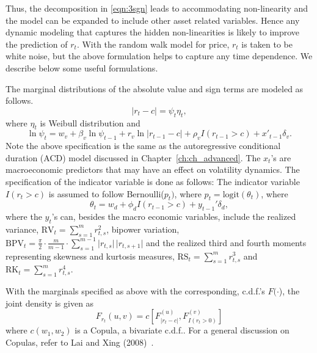 Thus, the decomposition in \eqref{eqn:3sgn} leads to accommodating non-linearity and the model can be expanded to include other asset related variables. Hence any dynamic modeling that captures the hidden non-linearities is likely to improve the prediction of $r_{t}$. With the random walk model for price, $r_t$ is taken to be white noise, but the above formulation helps to capture any time dependence. We describe below some useful formulations.


The marginal distributions of the absolute value and sign terms are modeled as follows.
	\begin{equation} \label{eqn:psieta}
	\lvert r_{t} - c \rvert = \psi_{t} \eta_{t},
	\end{equation}
where $\eta_{t}$ is Weibull distribution and
	\begin{equation} \label{eqn:lnspi}
	\ln{\psi_{t}} = w_{v} + \beta_{v} \ln{\psi_{t-1}} + r_{v} \ln\lvert r_{t-1} - c \rvert + \rho_{v} I(r_{t-1}>c) + x'_{t-1} \delta_{v}.
	\end{equation}
Note the above specification is the same as the autoregressive conditional duration (ACD) model discussed in Chapter~\ref{ch:ch_advanced}. The $x_{t}$'s  are macroeconomic predictors that may have an effect on volatility dynamics. The specification of the indicator variable is done as follows: The indicator variable $I(r_{t} > c)$ is assumed to follow Bernoulli($p_{t})$, where $p_{t} = \text{logit}(\theta_{t})$, where 
	\begin{equation}\label{eqn:3thetat}
	\theta_{t} = w_{d} + \phi_{d}I (r_{t-1}>c) + y_{t-1}'\delta_{d},
	\end{equation}
where the $y_{t}$'s can, besides the macro economic variables, include the realized variance, $\text{RV}_{t} = \sum_{s=1}^{m} r^2_{t,s}$, bipower variation, $\text{BPV}_{t} = \frac{\pi}{2} \cdot \frac{m}{m-1} \cdot \sum_{s=1}^{m-1} \lvert r_{t,s}\rvert\, \lvert r_{t,s+1}\rvert$ and the realized third and fourth moments representing skewness and kurtosis measures, $\text{RS}_{t} = \sum_{s=1}^m r_{t,s}^3$ and $\text{RK}_{t} = \sum_{s=1}^{m} r_{t,s}^4$.


With the marginals specified as above with the corresponding, c.d.f.'s $F(\cdot$), the joint density is given as
	\begin{equation}\label{eqn:frt}
	F_{r_t}(u,v) = c \left[ F_{\lvert r_t-c\rvert}^{(u)}, F_{I(r_t>0)}^{(v)} \right]
	\end{equation}
where $c(w_1, w_2)$ is a Copula, a bivariate c.d.f.. For a general discussion on Copulas, refer to Lai and Xing (2008)~\cite[Section 12.3.3]{lai1}.


